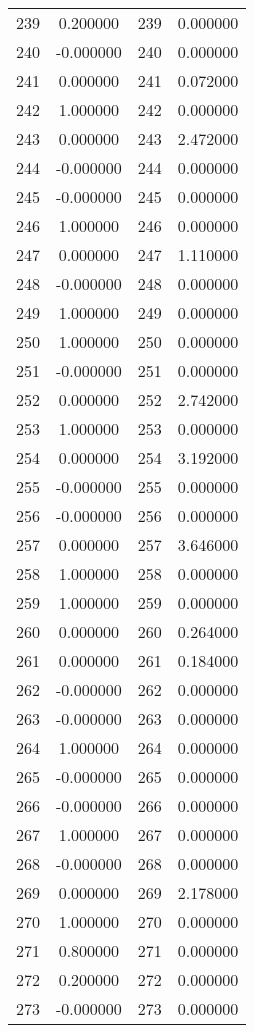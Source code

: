 \documentclass[12pt]{article}
\begin{document}
\begin{longtable}{@{}cccc@{}}
239 & 0.200000 & 239 & 0.000000 \\
240 & -0.000000 & 240 & 0.000000 \\
241 & 0.000000 & 241 & 0.072000 \\
242 & 1.000000 & 242 & 0.000000 \\
243 & 0.000000 & 243 & 2.472000 \\
244 & -0.000000 & 244 & 0.000000 \\
245 & -0.000000 & 245 & 0.000000 \\
246 & 1.000000 & 246 & 0.000000 \\
247 & 0.000000 & 247 & 1.110000 \\
248 & -0.000000 & 248 & 0.000000 \\
249 & 1.000000 & 249 & 0.000000 \\
250 & 1.000000 & 250 & 0.000000 \\
251 & -0.000000 & 251 & 0.000000 \\
252 & 0.000000 & 252 & 2.742000 \\
253 & 1.000000 & 253 & 0.000000 \\
254 & 0.000000 & 254 & 3.192000 \\
255 & -0.000000 & 255 & 0.000000 \\
256 & -0.000000 & 256 & 0.000000 \\
257 & 0.000000 & 257 & 3.646000 \\
258 & 1.000000 & 258 & 0.000000 \\
259 & 1.000000 & 259 & 0.000000 \\
260 & 0.000000 & 260 & 0.264000 \\
261 & 0.000000 & 261 & 0.184000 \\
262 & -0.000000 & 262 & 0.000000 \\
263 & -0.000000 & 263 & 0.000000 \\
264 & 1.000000 & 264 & 0.000000 \\
265 & -0.000000 & 265 & 0.000000 \\
266 & -0.000000 & 266 & 0.000000 \\
267 & 1.000000 & 267 & 0.000000 \\
268 & -0.000000 & 268 & 0.000000 \\
269 & 0.000000 & 269 & 2.178000 \\
270 & 1.000000 & 270 & 0.000000 \\
271 & 0.800000 & 271 & 0.000000 \\
272 & 0.200000 & 272 & 0.000000 \\
273 & -0.000000 & 273 & 0.000000 \\

\end{longtable}
\end{document}
